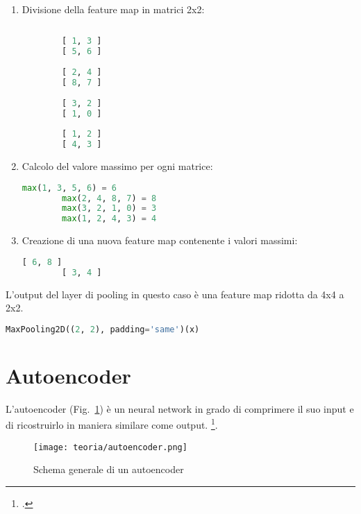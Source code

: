 \begin{enumerate}
    \item Divisione della feature map in matrici 2x2:
    \begin{lstlisting}[language=Python, frame=none]
    
        [ 1, 3 ]
        [ 5, 6 ]
        
        [ 2, 4 ]
        [ 8, 7 ]
        
        [ 3, 2 ]
        [ 1, 0 ]
        
        [ 1, 2 ]
        [ 4, 3 ]

    \end{lstlisting}
    \item Calcolo del valore massimo per ogni matrice:
    
    \begin{lstlisting}[language=Python, frame=none]
        max(1, 3, 5, 6) = 6
        max(2, 4, 8, 7) = 8
        max(3, 2, 1, 0) = 3
        max(1, 2, 4, 3) = 4
    \end{lstlisting}

    \item Creazione di una nuova feature map contenente i valori massimi:
    \begin{lstlisting}[language=Python, frame=none]
        [ 6, 8 ]
        [ 3, 4 ]
    \end{lstlisting}
\end{enumerate}
L'output del layer di pooling in questo caso è una feature map ridotta da 4x4 a 2x2.

\begin{lstlisting}[language=Python, frame=none]
    MaxPooling2D((2, 2), padding='same')(x)
\end{lstlisting}

\newpage

\section{Autoencoder}
L'autoencoder (Fig.~\ref{fig:autoencoder-teoria}) è un neural network in grado di comprimere il suo input e di ricostruirlo in maniera similare come output. \footcite[p.~499]{Goodfellow-et-al-2016}.

\begin{figure}[!h] 
    \centering 
    \texttt{[image: teoria/autoencoder.png]} 
    \caption{Schema generale di un autoencoder}
    \label{fig:autoencoder-teoria}
  \end{figure}

